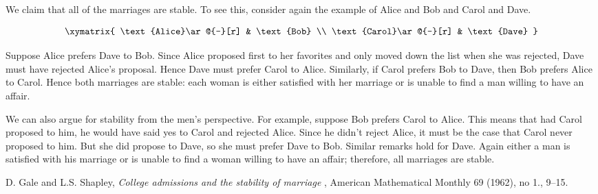 \documentclass[12pt]{article}
\begin{document}
We claim that all of the marriages are stable.  To see this, consider again the example of Alice and Bob and Carol and Dave.

\[\xymatrix{
\text{Alice}\ar@{-}[r] & \text{Bob} \\
\text{Carol}\ar@{-}[r] & \text{Dave}
}\]

Suppose Alice prefers Dave to Bob.  Since Alice proposed first to her favorites and only moved down the list when she was rejected, Dave must have rejected Alice's proposal.  Hence Dave must prefer Carol to Alice.  Similarly, if Carol prefers Bob to Dave, then Bob prefers Alice to Carol.  Hence both marriages are stable: each woman is either satisfied with her marriage or is unable to find a man willing to have an affair.

We can also argue for stability from the men's perspective.  For example, suppose Bob prefers Carol to Alice.  This means that had Carol proposed to him, he would have said yes to Carol and rejected Alice.  Since he didn't reject Alice, it must be the case that Carol never proposed to him.  But she did propose to Dave, so she must prefer Dave to Bob.  Similar remarks hold for Dave.  Again either a man is satisfied with his marriage or is unable to find a woman willing to have an affair; therefore, all marriages are stable.

\begin{thebibliography}{9}
D. Gale and L.S. Shapley, \emph{College admissions and the stability of marriage
}, American Mathematical Monthly 69 (1962), no 1., 9--15.
\end{thebibliography}

\end{document}
